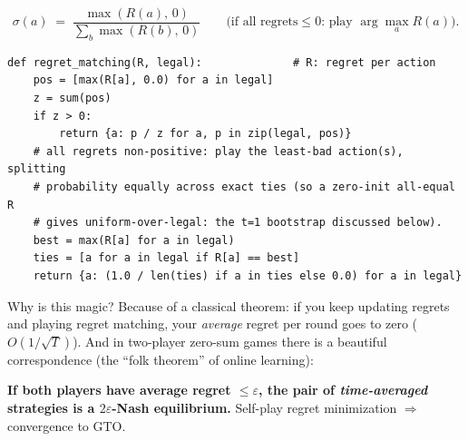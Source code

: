 \documentclass[11pt,a4paper]{article}
\begin{document}
\begin{equation*}
\sigma(a) \;=\; \frac{\max(R(a),\,0)}{\sum_{b}\max(R(b),\,0)}
\qquad\text{(if all regrets} \le 0\text{: play } \arg\max_a R(a) \text{).}
\end{equation*}

\begin{center}
\end{center}

\begin{lstlisting}[style=py, caption={Regret matching (the whole thing).}]
def regret_matching(R, legal):              # R: regret per action
    pos = [max(R[a], 0.0) for a in legal]
    z = sum(pos)
    if z > 0:
        return {a: p / z for a, p in zip(legal, pos)}
    # all regrets non-positive: play the least-bad action(s), splitting
    # probability equally across exact ties (so a zero-init all-equal R
    # gives uniform-over-legal: the t=1 bootstrap discussed below).
    best = max(R[a] for a in legal)
    ties = [a for a in legal if R[a] == best]
    return {a: (1.0 / len(ties) if a in ties else 0.0) for a in legal}
\end{lstlisting}

Why is this magic? Because of a classical theorem: if you keep updating regrets
and playing regret matching, your \emph{average} regret per round goes to zero
($O(1/\sqrt{T})$). And in two-player zero-sum games there is a beautiful
correspondence (the ``folk theorem'' of online learning):

\begin{defbox}
\textbf{If both players have average regret $\le \varepsilon$, the pair of
\emph{time-averaged} strategies is a $2\varepsilon$-Nash equilibrium.}
Self-play regret minimization $\Rightarrow$ convergence to GTO.
\end{defbox}
\end{document}
